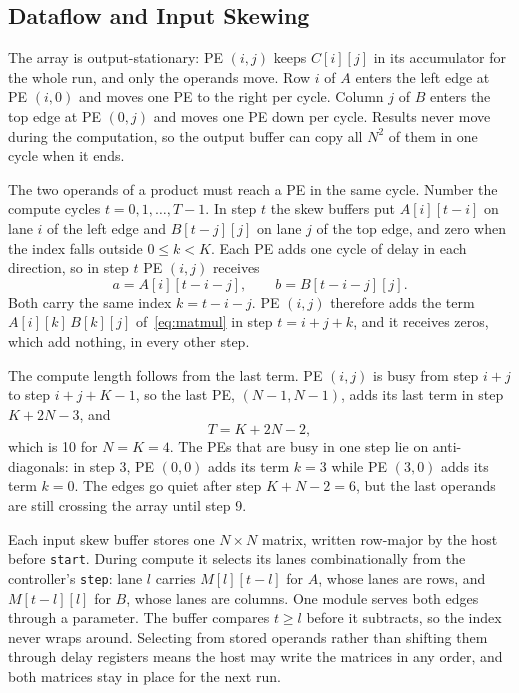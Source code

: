 
\subsection{Dataflow and Input Skewing}
The array is output-stationary: PE $(i,j)$ keeps $C[i][j]$ in its accumulator for the whole run, and only the operands move. Row $i$ of $A$ enters the left edge at PE $(i,0)$ and moves one PE to the right per cycle. Column $j$ of $B$ enters the top edge at PE $(0,j)$ and moves one PE down per cycle. Results never move during the computation, so the output buffer can copy all $N^2$ of them in one cycle when it ends.

The two operands of a product must reach a PE in the same cycle. Number the compute cycles $t = 0, 1, \ldots, T-1$. In step $t$ the skew buffers put $A[i][t-i]$ on lane $i$ of the left edge and $B[t-j][j]$ on lane $j$ of the top edge, and zero when the index falls outside $0 \le k < K$. Each PE adds one cycle of delay in each direction, so in step $t$ PE $(i,j)$ receives
\begin{equation}
a = A[i][t-i-j], \qquad b = B[t-i-j][j].
\end{equation}
Both carry the same index $k = t - i - j$. PE $(i,j)$ therefore adds the term $A[i][k]\,B[k][j]$ of~\eqref{eq:matmul} in step $t = i + j + k$, and it receives zeros, which add nothing, in every other step.

The compute length follows from the last term. PE $(i,j)$ is busy from step $i+j$ to step $i+j+K-1$, so the last PE, $(N{-}1,N{-}1)$, adds its last term in step $K + 2N - 3$, and
\begin{equation}
T = K + 2N - 2,
\end{equation}
which is 10 for $N = K = 4$. The PEs that are busy in one step lie on anti-diagonals: in step 3, PE $(0,0)$ adds its term $k = 3$ while PE $(3,0)$ adds its term $k = 0$. The edges go quiet after step $K + N - 2 = 6$, but the last operands are still crossing the array until step 9.

Each input skew buffer stores one $N \times N$ matrix, written row-major by the host before \texttt{start}. During compute it selects its lanes combinationally from the controller's \texttt{step}: lane $l$ carries $M[l][t-l]$ for $A$, whose lanes are rows, and $M[t-l][l]$ for $B$, whose lanes are columns. One module serves both edges through a parameter. The buffer compares $t \ge l$ before it subtracts, so the index never wraps around. Selecting from stored operands rather than shifting them through delay registers means the host may write the matrices in any order, and both matrices stay in place for the next run.

